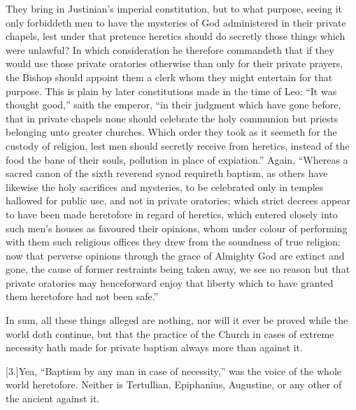 They bring in Justinian’s imperial constitution, but to what purpose,
 seeing it only forbiddeth men to have the mysteries of God administered in their private chapels, lest under that pretence heretics should do secretly those things which were unlawful? In which consideration he therefore commandeth that if they would use those private oratories otherwise than only for their private prayers, the Bishop should appoint them a clerk whom they might entertain for that purpose. This is plain by later constitutions made in the time of Leo: “It was thought good,” saith the emperor, “in their judgment which have gone before, that in private chapels none should celebrate the holy communion but priests belonging unto greater churches. Which order they took as it seemeth for the custody of religion, lest men should secretly receive from heretics, instead of the food the bane of their souls, pollution in place of expiation.” Again, “Whereas a sacred canon of the sixth reverend synod requireth baptism, as others have likewise the holy sacrifices and mysteries, to be celebrated only in temples hallowed for public use, and not in private oratories; which strict decrees appear to have been made heretofore in regard of heretics, which entered closely into such men’s houses as favoured their opinions, whom under colour of performing with them such religious offices they drew from the soundness of true religion: now that perverse opinions through the grace of Almighty God  are extinct and gone, the cause of former restraints being taken away, we see no reason but that private oratories may henceforward enjoy that liberty which to have granted them heretofore had not been safe.”

In sum, all these things alleged are nothing, nor will it ever be proved while the world doth continue, but that the practice of the Church in cases of extreme necessity hath made for private baptism always more than against it.

[3.]Yea, “Baptism by any man in case of necessity,” was the voice of the whole world heretofore. Neither is Tertullian, Epiphanius, Augustine, or any other of the ancient against it.

